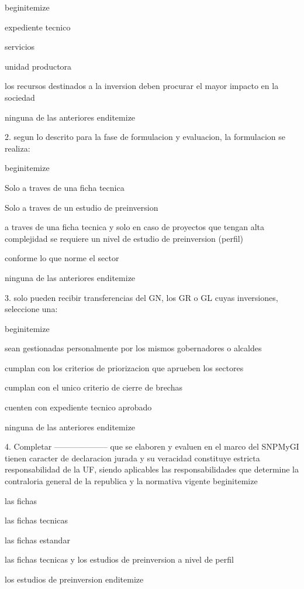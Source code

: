begin{itemize}
			\item expediente tecnico
 			\item servicios
			\item unidad productora
			\item los recursos destinados a la inversion deben procurar el mayor impacto en la sociedad 
			\item ninguna de las anteriores 
end{itemize} 

2. segun lo descrito para la fase de formulacion y evaluacion, la formulacion se realiza:

begin{itemize}
			\item Solo a traves de una ficha tecnica
 			\item Solo a traves de un estudio de preinversion 
			\item a traves de una ficha tecnica y solo en caso de proyectos que tengan alta complejidad se requiere un nivel de estudio de preinversion (perfil)
			\item conforme lo que norme el sector
			\item ninguna de las anteriores
end{itemize}

3. solo pueden recibir transferencias del GN, los GR o GL cuyas inversiones, seleccione una:

begin{itemize}
			\item sean gestionadas personalmente por los mismos gobernadores o alcaldes
 			\item cumplan con los criterios de priorizacion que aprueben los sectores
			\item cumplan con el unico criterio de cierre de brechas 
			\item cuenten con expediente tecnico aprobado
			\item ninguna de las anteriores
end{itemize}

4. Completar -------------------- que se elaboren y evaluen en el marco del SNPMyGI tienen caracter de declaracion jurada y su veracidad constituye estricta responsabilidad de la UF, siendo aplicables las responsabilidades que determine la contraloria general de la republica y la normativa vigente 
begin{itemize}
			\item las fichas
 			\item las fichas tecnicas
			\item las fichas estandar
			\item las fichas tecnicas y los estudios de preinversion a nivel de perfil
			\item los estudios de preinversion 
end{itemize}

